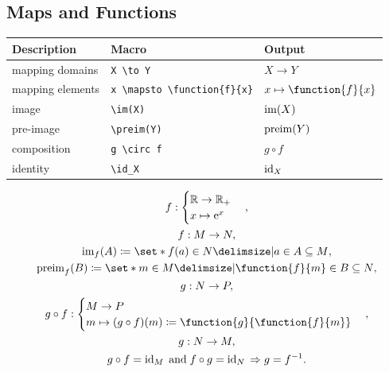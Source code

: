 \documentclass[DIV=13]{scrartcl}
\begin{document}
\subsection{Maps and Functions}
\begin{center}
  \begin{tabular}{lll}
    \toprule
    \textbf{Description} & \textbf{Macro}   & \textbf{Output} \\
    \midrule
    mapping domains      & \verb|X \to Y|   & $X \to Y$       \\
    mapping elements     & \verb|x \mapsto \function{f}{x}|
                         & $x \mapsto \function{f}{x}$        \\
    image                & \verb|\im(X)|    & $\operatorname{im}(X)$        \\
    pre-image            & \verb|\preim(Y)| & $\operatorname{preim}(Y)$     \\
    composition          & \verb|g \circ f| & $g \circ f$     \\
    identity             & \verb|\id_X|     & $\operatorname{id}_X$         \\
    \bottomrule
  \end{tabular}
\end{center}
\begin{gather}
  f : \begin{cases}
    \Rnums \to \Rnums_+ \\
    x \mapsto \e^x
  \end{cases}, \\
  f : M \to N, \\
  \im_f(A) \coloneq \set*{f(a) \in N \given a \in A \subseteq M}, \\
  \preim_f(B) \coloneq
  \set*{m \in M \given \function{f}{m} \in B \subseteq N}, \\
  g : N \to P, \\
  g \circ f : \begin{cases}
    M \to P \\
    m \mapsto (g \circ f)(m) \coloneq \function{g}{\function{f}{m}}
  \end{cases}, \\
  g : N \to M, \\
  g \circ f = \id_M \;\text{and}\; f \circ g = \id_N
  \;\lifthen\; g=f^{-1}.
\end{gather}
\end{document}
